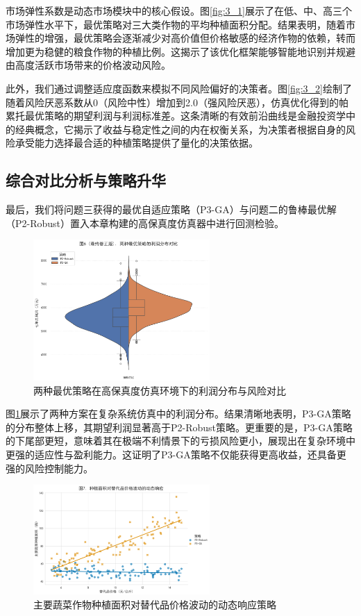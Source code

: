 \documentclass[withoutpreface,bwprint]{cumcmthesis} %
\begin{document}
市场弹性系数是动态市场模块中的核心假设。图\ref{fig:3_1}展示了在低、中、高三个市场弹性水平下，最优策略对三大类作物的平均种植面积分配。结果表明，随着市场弹性的增强，最优策略会逐渐减少对高价值但价格敏感的经济作物的依赖，转而增加更为稳健的粮食作物的种植比例。这揭示了该优化框架能够智能地识别并规避由高度活跃市场带来的价格波动风险。

此外，我们通过调整适应度函数来模拟不同风险偏好的决策者。图\ref{fig:3_2}绘制了随着风险厌恶系数从0（风险中性）增加到2.0（强风险厌恶），仿真优化得到的帕累托最优策略的期望利润与利润标准差。这条清晰的有效前沿曲线是金融投资学中的经典概念，它揭示了收益与稳定性之间的内在权衡关系，为决策者根据自身的风险承受能力选择最合适的种植策略提供了量化的决策依据。

\subsection{综合对比分析与策略升华}

最后，我们将问题三获得的最优自适应策略（P3-GA）与问题二的鲁棒最优解（P2-Robust）置入本章构建的高保真度仿真器中进行回测检验。

\begin{figure}[htbp]
	\centering
	\includegraphics[width=0.6\textwidth]{figures/3_4.png}
	\caption{两种最优策略在高保真度仿真环境下的利润分布与风险对比}
	\label{fig:3_4}
\end{figure}

图\ref{fig:3_4}展示了两种方案在复杂系统仿真中的利润分布。结果清晰地表明，P3-GA策略的分布整体上移，其期望利润显著高于P2-Robust策略。更重要的是，P3-GA策略的下尾部更短，意味着其在极端不利情景下的亏损风险更小，展现出在复杂环境中更强的适应性与盈利能力。这证明了P3-GA策略不仅能获得更高收益，还具备更强的风险控制能力。

\begin{figure}[htbp]
	\centering
	\includegraphics[width=0.6\textwidth]{figures/3_5.png}
	\caption{主要蔬菜作物种植面积对替代品价格波动的动态响应策略}
	\label{fig:3_5}
\end{figure}
\end{document}
